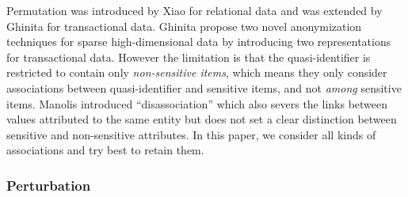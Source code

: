 Permutation was introduced by Xiao \etal \cite{Xiao:2006:Anatomy} for
relational data and was extended by
Ghinita \etal \cite{2011:TKDE:Anonymous}
for transactional data.
Ghinita \etal propose two novel anonymization techniques for sparse
high-dimensional data by introducing two representations for transactional
data. However the limitation is that the quasi-identifier is restricted to
contain only {\em non-sensitive items}, which means they only
consider associations between quasi-identifier
and sensitive items, and not {\em among} sensitive items.
Manolis \etal \cite{terrovitis:privacy} introduced ``disassociation''
which also severs the links between values attributed to the
same entity but does not
set a clear distinction between sensitive and non-sensitive attributes.
In this paper, we consider all kinds of associations and try best to
retain them.
%

\subsubsection{Perturbation}


